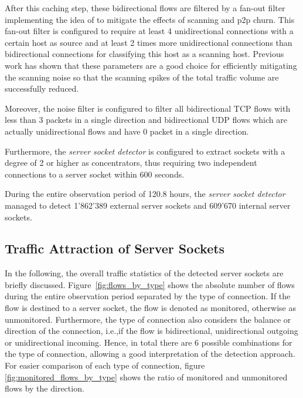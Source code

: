 After this caching step, these bidirectional flows are filtered by a fan-out filter implementing the idea of \citet{Allman:2007} to mitigate the effects of scanning and \gls{p2p} churn. 
This fan-out filter is configured to require at least 4 unidirectional connections with a certain host as source and at least 2 times more unidirectional connections than bidirectional connections for classifying this host as a scanning host. 
Previous work\citep{Schatzmann:Mining,Schatzmann:Dissection, Schatzmann:Tracing} has shown that these parameters are a good choice for efficiently mitigating the scanning noise so that the scanning spikes of the total traffic volume are successfully reduced.

Moreover, the noise filter is configured to filter all bidirectional \gls{TCP} flows with less than 3 packets in a single direction and bidirectional \gls{UDP} flows which are actually unidirectional flows and have 0 packet in a single direction.

Furthermore, the \emph{server socket detector} is configured to extract sockets with a degree of 2 or higher as concentrators, thus requiring two independent connections to a \gls{server socket} within 600 seconds.

During the entire observation period of 120.8 hours, the \emph{server socket detector} managed to detect 1'862'389 external \glspl{server socket} and 609'670 internal \glspl{server socket}.

\subsection{Traffic Attraction of Server Sockets}

In the following, the overall traffic statistics of the detected \glspl{server socket} are briefly discussed. Figure \ref{fig:flows_by_type} shows the absolute number of flows during the entire observation period separated by the type of connection. 
If the flow is destined to a \gls{server socket}, the flow is denoted as monitored, otherwise as unmonitored. 
Furthermore, the type of connection also considers the balance or direction of the connection, i.e.,if the flow is bidirectional, unidirectional outgoing or unidirectional incoming. 
Hence, in total there are 6 possible combinations for the type of connection, allowing a good interpretation of the detection approach. 
For easier comparison of each type of connection, figure \ref{fig:monitored_flows_by_type} shows the ratio of monitored and unmonitored flows by the direction.

